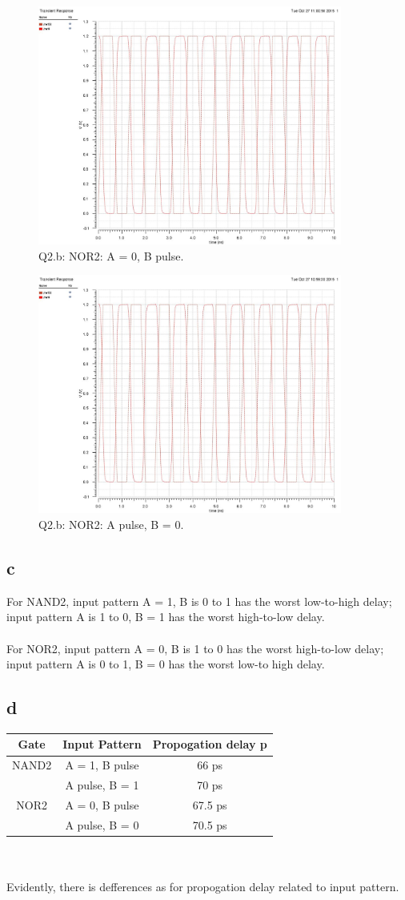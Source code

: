 \documentclass[a4paper,10pt]{article}
\begin{document}
\begin{figure}
 \centering
 \includegraphics[width=10cm]{HW4_Q2_b_NOR2_B_pulse.jpg}
 \caption{Q2.b: NOR2: A = 0, B pulse.}
\end{figure}
\begin{figure}
 \centering
 \includegraphics[width=10cm]{HW4_Q2_b_NOR2_A_pulse.jpg}
 \caption{Q2.b: NOR2: A pulse, B = 0.}
\end{figure}
\subsection*{c}
For NAND2, input pattern A = 1, B is 0 to 1 has the worst low-to-high delay; input pattern A is 1 to 0, B = 1 has the worst 
high-to-low delay.\\
\\
For NOR2, input pattern A = 0, B is 1 to 0 has the worst high-to-low delay; input pattern A is 0 to 1, B = 0 has the worst
low-to high delay.
\subsection*{d}
\begin{tabular}{|c|c|c|}
 \hline
 Gate&Input Pattern&Propogation delay p\\ \hline
 NAND2& A = 1, B pulse&66 ps\\ \cline{2-3}
 &A pulse, B = 1&70 ps\\ \hline
 NOR2& A = 0, B pulse&67.5 ps\\ \cline{2-3}
 &A pulse, B = 0&70.5 ps\\ \hline
\end{tabular}
\\
\\
Evidently, there is defferences as for propogation delay related to input pattern.
\end{document}
